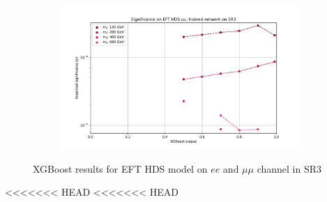 \documentclass[12pt, a4paper]{book}
\begin{document}
\begin{figure}[!ht]
\begin{subfigure}[b]{0.49\textwidth}
   \end{subfigure}
   \hfill
   \begin{subfigure}[b]{0.49\textwidth}
      \centering
      \includegraphics[width=1\textwidth]{XGBoost/Model_independent/150/EFT_HDS/EXP_SIG_uu.pdf}
   \end{subfigure}
   \caption{XGBoost results for EFT HDS model on $ee$ and $\mu\mu$ channel in SR3}\label{fig:EFT_HDS_SR3}
\end{figure}
<<<<<<< HEAD
<<<<<<< HEAD
\end{document}
